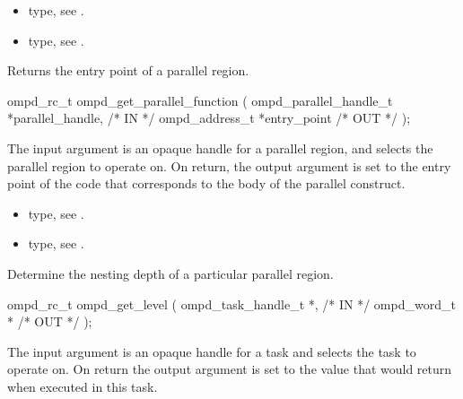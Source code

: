 \crossreferences
\begin{itemize}
	\item {} type, see .
	\item {} type, see .
\end{itemize}

\summary
Returns the entry point of a parallel region.

\format
\cspecificstart
\begin{boxedcode}
ompd\_rc\_t ompd\_get\_parallel\_function (
                 ompd\_parallel\_handle\_t  *parallel\_handle,  /* IN  */
                 ompd\_address\_t          *entry_point         /* OUT */
);
\end{boxedcode}
\cspecificend

\descr

\argdesc
The input argument  is an opaque handle for a
parallel region, and selects the parallel region to operate on.
On return,  the output argument  is set to the
entry point of the code that corresponds to the body of the parallel
construct.

\crossreferences
\begin{itemize}
	\item {} type, see .
	\item {} type, see .
\end{itemize}


\summary
Determine the nesting depth of a particular parallel region.

\format
\cspecificstart
\begin{boxedcode}
ompd\_rc\_t ompd\_get\_level (
  ompd\_task\_handle\_t *,                                 /* IN */
  ompd\_word\_t *                                         /* OUT */
); 
\end{boxedcode}
\cspecificend

\descr

\argdesc
The input argument  is an opaque handle for a task and selects the task to operate on.
On return the output argument  is set to the value that  would return when
executed in this task.


